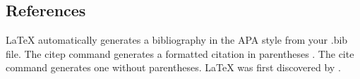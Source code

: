 \documentclass[a4paper,man,natbib,floatsintext]{apa6}
\begin{document}

\subsection{References}

LaTeX automatically generates a bibliography in the APA style from your .bib file. The citep command generates a formatted citation in parentheses \citep{Lamport1986}. The cite command generates one without parentheses. LaTeX was first discovered by \cite{Lamport1986}.






\end{document}
